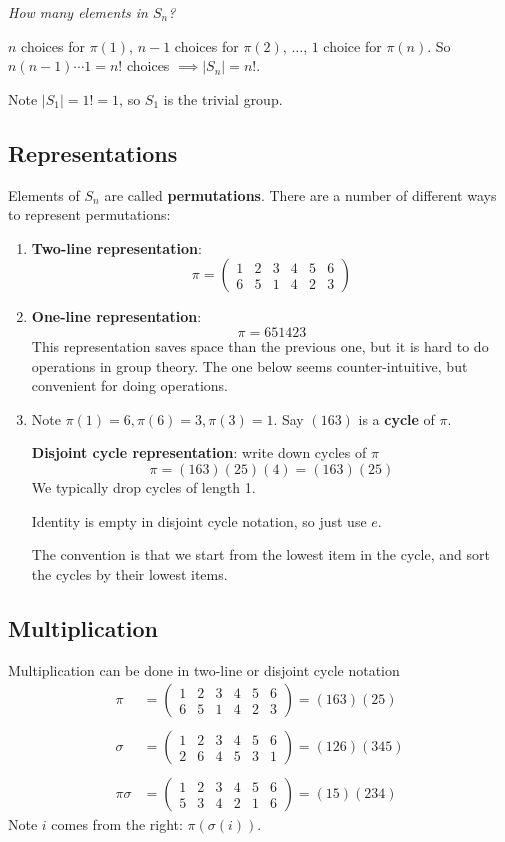 \textit{How many elements in $S_n$?}

$n$ choices for $\pi(1)$, $n-1$ choices for $\pi(2)$, $\ldots$, $1$ choice for $\pi(n)$. So $n(n-1)\cdots 1 = n!$ choices $\implies |S_n|=n!$.

Note $|S_1|=1!=1$, so $S_1$ is the trivial group.

\subsection{Representations}
Elements of $S_n$ are called \textbf{permutations}. There are a number of different ways to represent permutations:
\begin{enumerate}
\item \textbf{Two-line representation}:
$$
\pi=\left(\begin{array}{llllll}
1 & 2 & 3 & 4 & 5 & 6 \\
6 & 5 & 1 & 4 & 2 & 3
\end{array}\right)
$$
\item \textbf{One-line representation}: $$\pi=651423$$
This representation saves space than the previous one, but it is hard to do operations in group theory. The one below seems counter-intuitive, but convenient for doing operations.
\item Note $\pi(1)=6, \pi(6)=3, \pi(3)=1$. Say $(163)$ is a \textbf{cycle} of $\pi$.

\textbf{Disjoint cycle representation}: write down cycles of $\pi$
$$
\pi= (163)(25)(4)=(163)(25)
$$
We typically drop cycles of length 1.

Identity is empty in disjoint cycle notation, so just use $e$. 

The convention is that we start from the lowest item in the cycle, and sort the cycles by their lowest items.
\end{enumerate}
\subsection*{Multiplication}
Multiplication can be done in two-line or disjoint cycle notation
$$
\begin{aligned}
\pi&=\left(\begin{array}{cccccc}
1 & 2 & 3 & 4 & 5 & 6 \\
6 & 5 & 1 & 4 & 2 & 3
\end{array}\right)=(163)(25) \\\\
\sigma&=\left(\begin{array}{cccccc}
1 & 2 & 3 & 4 & 5 & 6 \\
2 & 6 & 4 & 5 & 3 & 1
\end{array}\right)=(126)(345) \\\\
\pi \sigma&=\left(\begin{array}{cccccc}
1 & 2 & 3 & 4 & 5 & 6 \\
5 & 3 & 4 & 2 & 1 & 6
\end{array}\right)=(15)(234)
\end{aligned}
$$
Note $i$ comes from the right: $\pi(\sigma(i))$.

